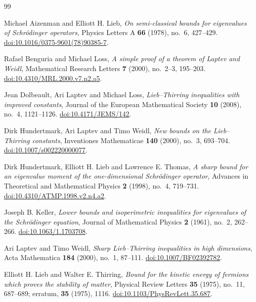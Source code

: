 \begin{thebibliography}{99}
\raggedright

Michael Aizenman and Elliott H. Lieb,
\emph{On semi-classical bounds for eigenvalues of Schr\"odinger operators},
Physics Letters A \textbf{66} (1978), no.~6, 427--429.
\href{https://doi.org/10.1016/0375-9601(78)90385-7}{doi:10.1016/0375-9601(78)90385-7}.

Rafael Benguria and Michael Loss,
\emph{A simple proof of a theorem of Laptev and Weidl},
Mathematical Research Letters \textbf{7} (2000), no.~2--3, 195--203.
\href{https://doi.org/10.4310/MRL.2000.v7.n2.a5}{doi:10.4310/MRL.2000.v7.n2.a5}.

Jean Dolbeault, Ari Laptev and Michael Loss,
\emph{Lieb--Thirring inequalities with improved constants},
Journal of the European Mathematical Society \textbf{10} (2008), no.~4,
1121--1126.
\href{https://doi.org/10.4171/JEMS/142}{doi:10.4171/JEMS/142}.

Dirk Hundertmark, Ari Laptev and Timo Weidl,
\emph{New bounds on the Lieb--Thirring constants},
Inventiones Mathematicae \textbf{140} (2000), no.~3, 693--704.
\href{https://doi.org/10.1007/s002220000077}{doi:10.1007/s002220000077}.

Dirk Hundertmark, Elliott H. Lieb and Lawrence E. Thomas,
\emph{A sharp bound for an eigenvalue moment of the one-dimensional
Schr\"odinger operator},
Advances in Theoretical and Mathematical Physics \textbf{2} (1998), no.~4,
719--731.
\href{https://doi.org/10.4310/ATMP.1998.v2.n4.a2}{doi:10.4310/ATMP.1998.v2.n4.a2}.

Joseph B. Keller,
\emph{Lower bounds and isoperimetric inequalities for eigenvalues of the
Schr\"odinger equation},
Journal of Mathematical Physics \textbf{2} (1961), no.~2, 262--266.
\href{https://doi.org/10.1063/1.1703708}{doi:10.1063/1.1703708}.

Ari Laptev and Timo Weidl,
\emph{Sharp Lieb--Thirring inequalities in high dimensions},
Acta Mathematica \textbf{184} (2000), no.~1, 87--111.
\href{https://doi.org/10.1007/BF02392782}{doi:10.1007/BF02392782}.

Elliott H. Lieb and Walter E. Thirring,
\emph{Bound for the kinetic energy of fermions which proves the stability
of matter},
Physical Review Letters \textbf{35} (1975), no.~11, 687--689;
erratum, \textbf{35} (1975), 1116.
\href{https://doi.org/10.1103/PhysRevLett.35.687}{doi:10.1103/PhysRevLett.35.687}.


\end{thebibliography}
